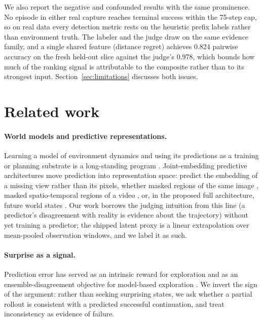 \documentclass[11pt]{article}
\begin{document}
We also report the negative and confounded results with the same prominence. No episode in
either real capture reaches terminal success within the 75-step cap, so on real data every
detection metric rests on the heuristic prefix labels rather than environment truth. The
labeler and the judge draw on the same evidence family, and a single shared feature (distance
regret) achieves 0.824 pairwise accuracy on the fresh held-out slice against the judge's
0.978, which bounds how much of the ranking signal is attributable to the composite rather
than to its strongest input. Section~\ref{sec:limitations} discusses both issues.

\section{Related work}
\label{sec:related}

\paragraph{World models and predictive representations.}
Learning a model of environment dynamics and using its predictions as a training or planning
substrate is a long-standing program \citep{ha2018worldmodels, hafner2020dreamer,
hafner2023dreamerv3, hansen2022tdmpc}. Joint-embedding predictive architectures move
prediction into representation space: predict the embedding of a missing view rather than
its pixels, whether masked regions of the same image \citep{assran2023ijepa}, masked
spatio-temporal regions of a video \citep{bardes2024vjepa}, or, in the proposed full
architecture, future world states \citep{lecun2022path}. Our work borrows the judging
intuition from this line (a predictor's disagreement with reality is evidence about the
trajectory) without yet training a predictor; the shipped latent proxy is a linear
extrapolation over mean-pooled observation windows, and we label it as such.

\paragraph{Surprise as a signal.}
Prediction error has served as an intrinsic reward for exploration \citep{pathak2017curiosity,
burda2019rnd} and as an ensemble-disagreement objective for model-based exploration
\citep{sekar2020plan2explore}. We invert the sign of the argument: rather than seeking
surprising states, we ask whether a partial rollout is consistent with a predicted successful
continuation, and treat inconsistency as evidence of failure.
\end{document}
